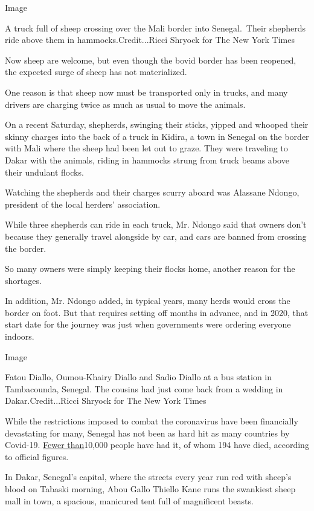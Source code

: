 Image

A truck full of sheep crossing over the Mali border into Senegal.~Their
shepherds ride above them in hammocks.Credit...Ricci Shryock for The New
York Times

Now sheep are welcome, but even though the bovid border has been
reopened, the expected surge of sheep has not materialized.

One reason is that sheep now must be transported only in trucks, and
many drivers are charging twice as much as usual to move the animals.

On a recent Saturday, shepherds, swinging their sticks, yipped and
whooped their skinny charges into the back of a truck in Kidira, a town
in Senegal on the border with Mali where the sheep had been let out to
graze. They were traveling to Dakar with the animals, riding in hammocks
strung from truck beams above their undulant flocks.

Watching the shepherds and their charges scurry aboard was Alassane
Ndongo, president of the local herders' association.

While three shepherds can ride in each truck, Mr. Ndongo said that
owners don't because they generally travel alongside by car, and cars
are banned from crossing the border.

So many owners were simply keeping their flocks home, another reason for
the shortages.

In addition, Mr. Ndongo added, in typical years, many herds would cross
the border on foot. But that requires setting off months in advance, and
in 2020, that start date for the journey was just when governments were
ordering everyone indoors.

Image

Fatou Diallo, Oumou-Khairy Diallo and Sadio Diallo at a bus station in
Tambacounda, Senegal. The cousins had just come back from a wedding in
Dakar.Credit...Ricci Shryock for The New York Times

While the restrictions imposed to combat the coronavirus have been
financially devastating for many, Senegal has not been as hard hit as
many countries by Covid-19.
\href{https://www.nytimes.com/interactive/2020/world/coronavirus-maps.html}{Fewer
than}10,000 people have had it, of whom 194 have died, according to
official figures.

In Dakar, Senegal's capital, where the streets every year run red with
sheep's blood on Tabaski morning, Abou Gallo Thiello Kane runs the
swankiest sheep mall in town, a spacious, manicured tent full of
magnificent beasts.

